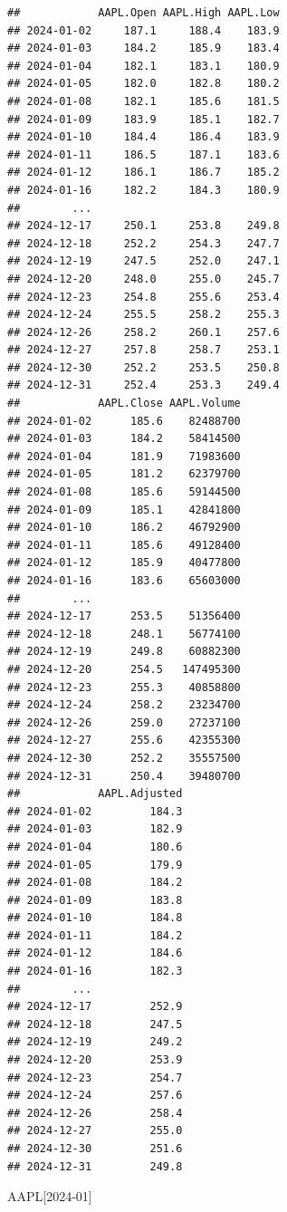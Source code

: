 \documentclass[]{ctexbook}
\newenvironment{Shaded}{\begin{snugshade}}{\end{snugshade}}
\newcommand{\NormalTok}[1]{#1}
\newcommand{\StringTok}[1]{\textcolor[rgb]{0.31,0.60,0.02}{#1}}
\begin{document}
\begin{verbatim}
##            AAPL.Open AAPL.High AAPL.Low
## 2024-01-02     187.1     188.4    183.9
## 2024-01-03     184.2     185.9    183.4
## 2024-01-04     182.1     183.1    180.9
## 2024-01-05     182.0     182.8    180.2
## 2024-01-08     182.1     185.6    181.5
## 2024-01-09     183.9     185.1    182.7
## 2024-01-10     184.4     186.4    183.9
## 2024-01-11     186.5     187.1    183.6
## 2024-01-12     186.1     186.7    185.2
## 2024-01-16     182.2     184.3    180.9
##        ...                             
## 2024-12-17     250.1     253.8    249.8
## 2024-12-18     252.2     254.3    247.7
## 2024-12-19     247.5     252.0    247.1
## 2024-12-20     248.0     255.0    245.7
## 2024-12-23     254.8     255.6    253.4
## 2024-12-24     255.5     258.2    255.3
## 2024-12-26     258.2     260.1    257.6
## 2024-12-27     257.8     258.7    253.1
## 2024-12-30     252.2     253.5    250.8
## 2024-12-31     252.4     253.3    249.4
##            AAPL.Close AAPL.Volume
## 2024-01-02      185.6    82488700
## 2024-01-03      184.2    58414500
## 2024-01-04      181.9    71983600
## 2024-01-05      181.2    62379700
## 2024-01-08      185.6    59144500
## 2024-01-09      185.1    42841800
## 2024-01-10      186.2    46792900
## 2024-01-11      185.6    49128400
## 2024-01-12      185.9    40477800
## 2024-01-16      183.6    65603000
##        ...                       
## 2024-12-17      253.5    51356400
## 2024-12-18      248.1    56774100
## 2024-12-19      249.8    60882300
## 2024-12-20      254.5   147495300
## 2024-12-23      255.3    40858800
## 2024-12-24      258.2    23234700
## 2024-12-26      259.0    27237100
## 2024-12-27      255.6    42355300
## 2024-12-30      252.2    35557500
## 2024-12-31      250.4    39480700
##            AAPL.Adjusted
## 2024-01-02         184.3
## 2024-01-03         182.9
## 2024-01-04         180.6
## 2024-01-05         179.9
## 2024-01-08         184.2
## 2024-01-09         183.8
## 2024-01-10         184.8
## 2024-01-11         184.2
## 2024-01-12         184.6
## 2024-01-16         182.3
##        ...              
## 2024-12-17         252.9
## 2024-12-18         247.5
## 2024-12-19         249.2
## 2024-12-20         253.9
## 2024-12-23         254.7
## 2024-12-24         257.6
## 2024-12-26         258.4
## 2024-12-27         255.0
## 2024-12-30         251.6
## 2024-12-31         249.8
\end{verbatim}

\begin{Shaded}
\begin{Highlighting}[]
\NormalTok{AAPL[}\StringTok{\textquotesingle{}2024{-}01\textquotesingle{}}\NormalTok{]}
\end{Highlighting}
\end{Shaded}
\end{document}
